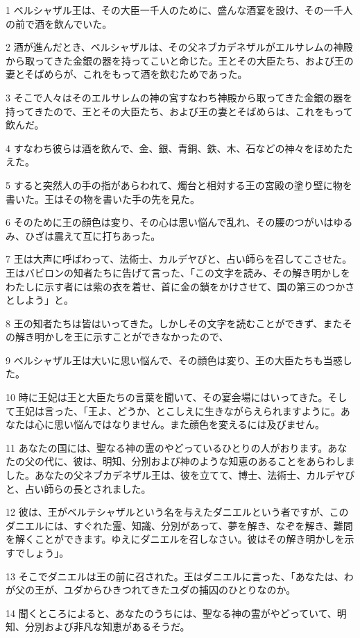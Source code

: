 \par 1 ベルシャザル王は、その大臣一千人のために、盛んな酒宴を設け、その一千人の前で酒を飲んでいた。
\par 2 酒が進んだとき、ベルシャザルは、その父ネブカデネザルがエルサレムの神殿から取ってきた金銀の器を持ってこいと命じた。王とその大臣たち、および王の妻とそばめらが、これをもって酒を飲むためであった。
\par 3 そこで人々はそのエルサレムの神の宮すなわち神殿から取ってきた金銀の器を持ってきたので、王とその大臣たち、および王の妻とそばめらは、これをもって飲んだ。
\par 4 すなわち彼らは酒を飲んで、金、銀、青銅、鉄、木、石などの神々をほめたたえた。
\par 5 すると突然人の手の指があらわれて、燭台と相対する王の宮殿の塗り壁に物を書いた。王はその物を書いた手の先を見た。
\par 6 そのために王の顔色は変り、その心は思い悩んで乱れ、その腰のつがいはゆるみ、ひざは震えて互に打ちあった。
\par 7 王は大声に呼ばわって、法術士、カルデヤびと、占い師らを召してこさせた。王はバビロンの知者たちに告げて言った、「この文字を読み、その解き明かしをわたしに示す者には紫の衣を着せ、首に金の鎖をかけさせて、国の第三のつかさとしよう」と。
\par 8 王の知者たちは皆はいってきた。しかしその文字を読むことができず、またその解き明かしを王に示すことができなかったので、
\par 9 ベルシャザル王は大いに思い悩んで、その顔色は変り、王の大臣たちも当惑した。
\par 10 時に王妃は王と大臣たちの言葉を聞いて、その宴会場にはいってきた。そして王妃は言った、「王よ、どうか、とこしえに生きながらえられますように。あなたは心に思い悩んではなりません。また顔色を変えるには及びません。
\par 11 あなたの国には、聖なる神の霊のやどっているひとりの人がおります。あなたの父の代に、彼は、明知、分別および神のような知恵のあることをあらわしました。あなたの父ネブカデネザル王は、彼を立てて、博士、法術士、カルデヤびと、占い師らの長とされました。
\par 12 彼は、王がベルテシャザルという名を与えたダニエルという者ですが、このダニエルには、すぐれた霊、知識、分別があって、夢を解き、なぞを解き、難問を解くことができます。ゆえにダニエルを召しなさい。彼はその解き明かしを示すでしょう」。
\par 13 そこでダニエルは王の前に召された。王はダニエルに言った、「あなたは、わが父の王が、ユダからひきつれてきたユダの捕囚のひとりなのか。
\par 14 聞くところによると、あなたのうちには、聖なる神の霊がやどっていて、明知、分別および非凡な知恵があるそうだ。
